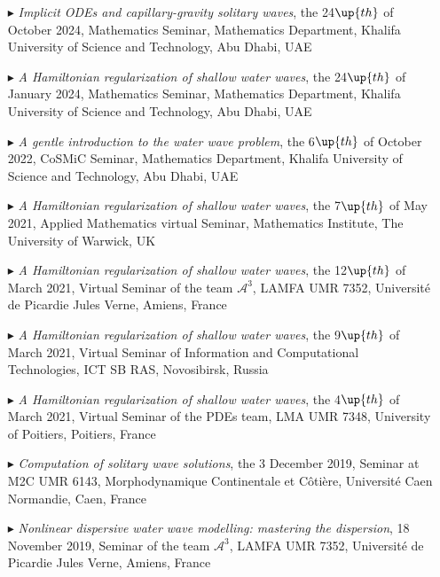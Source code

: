 \begin{itemize}

  \item[$\blacktriangleright$] \textit{Implicit ODEs and capillary-gravity solitary waves}, the 24$\up{th}$ of October 2024, Mathematics Seminar, Mathematics Department, Khalifa University of Science and Technology, Abu Dhabi, UAE

  \item[$\blacktriangleright$] \textit{A Hamiltonian regularization of shallow water waves}, the 24$\up{th}$ of January 2024, Mathematics Seminar, Mathematics Department, Khalifa University of Science and Technology, Abu Dhabi, UAE

  \item[$\blacktriangleright$] \textit{A gentle introduction to the water wave problem}, the 6$\up{th}$ of October 2022, CoSMiC Seminar, Mathematics Department, Khalifa University of Science and Technology, Abu Dhabi, UAE

  \item[$\blacktriangleright$] \textit{A Hamiltonian regularization of shallow water waves}, the 7$\up{th}$ of May 2021, Applied Mathematics virtual Seminar, Mathematics Institute, The University of Warwick, UK

  \item[$\blacktriangleright$] \textit{A Hamiltonian regularization of shallow water waves}, the 12$\up{th}$ of March 2021, Virtual Seminar of the team $\mathcal{A}^3$, LAMFA UMR 7352, Universit\'e de Picardie Jules Verne, Amiens, France

  \item[$\blacktriangleright$] \textit{A Hamiltonian regularization of shallow water waves}, the 9$\up{th}$ of March 2021, Virtual Seminar of Information and Computational Technologies, ICT SB RAS, Novosibirsk, Russia

  \item[$\blacktriangleright$] \textit{A Hamiltonian regularization of shallow water waves}, the 4$\up{th}$ of March 2021, Virtual Seminar of the PDEs team, LMA UMR 7348, University of Poitiers, Poitiers, France

  \item[$\blacktriangleright$] \textit{Computation of solitary wave solutions}, the 3 December 2019, Seminar at M2C UMR 6143, Morphodynamique Continentale et C\^oti\`ere, Universit\'e Caen Normandie, Caen, France

  \item[$\blacktriangleright$] \textit{Nonlinear dispersive water wave modelling: mastering the dispersion}, 18 November 2019, Seminar of the team $\mathcal{A}^3$, LAMFA UMR 7352, Universit\'e de Picardie Jules Verne, Amiens, France


\end{itemize}
